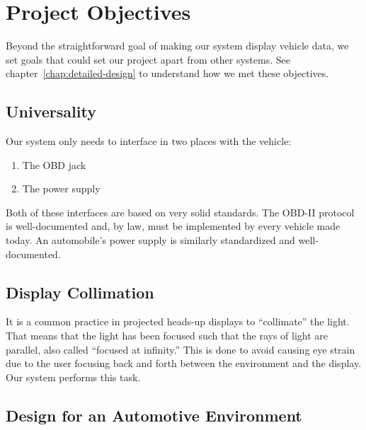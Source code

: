 \chapter{Project Objectives}



Beyond the straightforward goal of making our system display vehicle data, we
set goals that could set our project apart from other systems. See
chapter~\ref{chap:detailed-design} to understand how we met these objectives.

\section{Universality}

Our system only needs to interface in two places with the vehicle:

\begin{enumerate}

\item The OBD jack
\item The power supply

\end{enumerate}

Both of these interfaces are based on very solid standards. The OBD-II protocol
is well-documented and, by law, must be implemented by every vehicle made
today. An automobile's power supply is similarly standardized and
well-documented.

\section{Display Collimation}

It is a common practice in projected heads-up displays to ``collimate'' the
light. That means that the light has been focused such that the rays of light
are parallel, also called ``focused at infinity.'' This is done to avoid
causing eye strain due to the user focusing back and forth between the
environment and the display. Our system performs this task.

\section{Design for an Automotive Environment}
